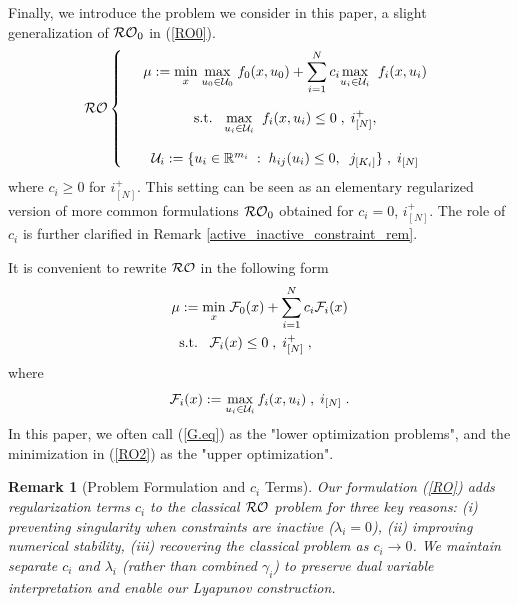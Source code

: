 \documentclass[journal,twoside,web]{ieeecolor}
\newcommand{\rev}[1]{\textcolor{revisionblue}{#1}}
\newtheorem{remark}{Remark}
\begin{document}
Finally, we introduce the problem we consider in this paper, a slight generalization of ${\cal RO}_0$ in (\ref{RO0}).
\begin{equation}{\cal RO}\left\{\begin{array}{ccc}
&\mu:=\underset{x}{\min} \;\underset{u_0\in {\cal U}_0}{\max}\; f_0(x,u_0)+\displaystyle\sum_{i=1}^N c_i \underset{u_i\in {\cal U}_i}{\max}\;\; f_i(x,u_i)\label{RO}\\ \\
&\text{s.t.}\;\;\;\underset{u_i\in {\cal U}_i}{\max}\;\; f_i(x,u_i)\leq 0\;,\;i^+_{[N]},\\ \\
&{\cal U}_i:=\{u_ i\in \mathbb{R}^{m_i}\;:\;h_{ij}(u_i)\leq 0,\;\;j_{[K_i]}\}\;,\;i_{[N]}
\end{array}\right.
\end{equation}
where $c_i\geq 0$ for $i^+_{[N]}$. This setting can be seen as an elementary regularized version of more common formulations ${\cal RO}_0$ obtained for $c_i=0$, $i_{[N]}^+$.
The role of $c_i$ is further clarified in Remark \ref{active_inactive_constraint_rem}.

It is convenient to rewrite ${\cal RO}$ in the following form
\begin{align}
&\mu:=\underset{x}{\min} \; {\cal F}_0(x)+\sum_{i=1}^N c_i{\cal F}_i(x)\label{RO2}\\
&\;\;\text{s.t.}\;\;\;{\cal F}_i(x)\leq 0\;,\;i^+_{[N]}\;,\nonumber
\end{align}
where
\begin{equation}\label{G.eq}
{\cal F}_i(x):=\max_{u_i\in {\cal U}_i} f_i(x,u_i)\;,\; i_{[N]}\;.
\end{equation}
In this paper, we often call (\ref{G.eq}) as the "lower optimization problems", and the minimization in (\ref{RO2}) as the "upper optimization".

\begin{remark}[\rev{Problem Formulation and $c_i$ Terms}]
\rev{Our formulation (\ref{RO}) adds regularization terms $c_i$ to the classical ${\cal RO}$ problem for three key reasons: (i) preventing singularity when constraints are inactive ($\lambda_i = 0$), (ii) improving numerical stability, (iii) recovering the classical problem as $c_i \to 0$. We maintain separate $c_i$ and $\lambda_i$ (rather than combined $\gamma_i$) to preserve dual variable interpretation and enable our Lyapunov construction.}
\end{remark}
\end{document}
